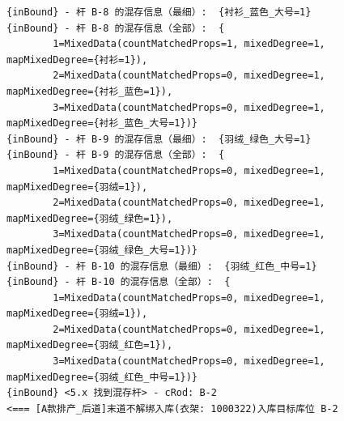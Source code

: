 {\begin{verbatim}
{inBound} - 杆 B-8 的混存信息（最细）:  {衬衫_蓝色_大号=1}
{inBound} - 杆 B-8 的混存信息（全部）:  {
		1=MixedData(countMatchedProps=1, mixedDegree=1, mapMixedDegree={衬衫=1}), 
		2=MixedData(countMatchedProps=0, mixedDegree=1, mapMixedDegree={衬衫_蓝色=1}), 
		3=MixedData(countMatchedProps=0, mixedDegree=1, mapMixedDegree={衬衫_蓝色_大号=1})}
{inBound} - 杆 B-9 的混存信息（最细）:  {羽绒_绿色_大号=1}
{inBound} - 杆 B-9 的混存信息（全部）:  {
		1=MixedData(countMatchedProps=0, mixedDegree=1, mapMixedDegree={羽绒=1}), 
		2=MixedData(countMatchedProps=0, mixedDegree=1, mapMixedDegree={羽绒_绿色=1}), 
		3=MixedData(countMatchedProps=0, mixedDegree=1, mapMixedDegree={羽绒_绿色_大号=1})}
{inBound} - 杆 B-10 的混存信息（最细）:  {羽绒_红色_中号=1}
{inBound} - 杆 B-10 的混存信息（全部）:  {
		1=MixedData(countMatchedProps=0, mixedDegree=1, mapMixedDegree={羽绒=1}), 
		2=MixedData(countMatchedProps=0, mixedDegree=1, mapMixedDegree={羽绒_红色=1}), 
		3=MixedData(countMatchedProps=0, mixedDegree=1, mapMixedDegree={羽绒_红色_中号=1})}
{inBound} <5.x 找到混存杆> - cRod: B-2
<=== [A款排产_后道]末道不解绑入库(衣架: 1000322)入库目标库位 B-2


\end{verbatim}}
